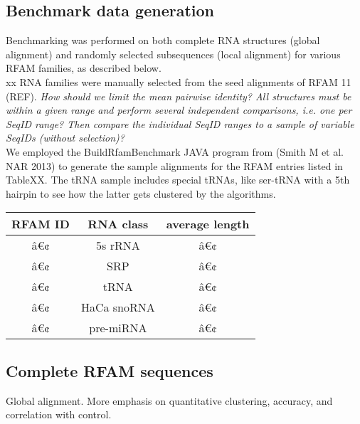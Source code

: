 \documentclass[a4paper,twoside]{article}
\begin{document}
\subsection{Benchmark data generation} 

Benchmarking was performed on both complete RNA structures (global alignment) and randomly selected subsequences (local alignment) for various RFAM families, as described below. \\

xx RNA families were manually selected from the seed alignments of RFAM 11 (REF). \textit{How should we limit the mean pairwise identity? All structures must be within a given range and perform several independent comparisons, i.e. one per SeqID range? Then compare the individual SeqID ranges to a sample of variable SeqIDs (without selection)?}\\

We employed the BuildRfamBenchmark JAVA program from (Smith M et al. NAR 2013) to generate the sample alignments for the RFAM entries listed in TableXX. The tRNA sample includes special tRNAs, like ser-tRNA with a 5th hairpin to see how the latter gets clustered by the algorithms. \\

\begin{tabular}{|c|c|c|}
\hline 
\textbf{RFAM ID} & \textbf{RNA class} & \textbf{average length} \\ 
\hline 
â€¢ & 5s rRNA & â€¢ \\ 
â€¢ & SRP & â€¢ \\ 
â€¢ & tRNA & â€¢ \\ 
â€¢ & HaCa snoRNA & â€¢ \\ 
â€¢ & pre-miRNA & â€¢ \\ 
\hline 
\end{tabular} 


\subsection{Complete RFAM sequences}

Global alignment. More emphasis on quantitative clustering, accuracy, and correlation with control. 
\end{document}
